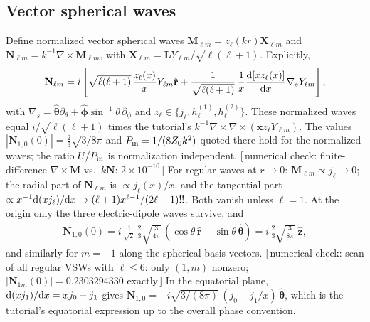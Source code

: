 \documentclass[11pt,letterpaper]{article}
\newcommand{\vect}[1]{\mathbf{#1}}
\newcommand{\Mv}{\vect{M}}
\newcommand{\Nv}{\vect{N}}
\newcommand{\xv}{\vect{x}}
\newcommand{\rhat}{\hat{\vect{r}}}
\newcommand{\zhat}{\hat{\vect{z}}}
\newcommand{\numcheck}[1]{\hfill{\small\color{green!40!black}[\,numerical check: #1\,]}}
\begin{document}
\subsection{Vector spherical waves}
Define normalized vector spherical waves $\Mv_{\ell m}=z_\ell(kr)\vect X_{\ell m}$ and $\Nv_{\ell m}=k^{-1}\nabla\times\Mv_{\ell m}$, with $\vect X_{\ell m}=\vect L Y_{\ell m}/\sqrt{\ell(\ell+1)}$. Explicitly,
\begin{align}
    \Nv_{\ell m} = i\left[\sqrt{\ell(\ell+1)}\,\frac{z_\ell(x)}{x}Y_{\ell m}\rhat+\frac{1}{\sqrt{\ell(\ell+1)}}\,\frac{1}{x}\frac{{\rm d}[xz_\ell(x)]}{{\rm d}x}\nabla_sY_{\ell m}\right],
\end{align}
with $\nabla_s=\hat{\bm\theta}\partial_\theta+\hat{\bm\phi}\sin^{-1}\!\theta\,\partial_\phi$ and $z_\ell\in\{j_\ell,h^{(1)}_\ell,h^{(2)}_\ell\}$. These normalized waves equal $i/\sqrt{\ell(\ell+1)}$ times the tutorial's $k^{-1}\nabla\times\nabla\times(\xv z_\ell Y_{\ell m})$. The values $|\Nv_{1,0}(0)|=\tfrac23\sqrt{3/8\pi}$ and $P_{\rm in}=1/(8Z_0k^2)$ quoted there hold for the normalized waves; the ratio $U/P_{\rm in}$ is normalization independent.
\numcheck{finite-difference $\nabla\times\Mv$ vs.\ $k\Nv$: $2\times10^{-10}$}
For regular waves at $r\to0$: $\Mv_{\ell m}\propto j_\ell\to0$; the radial part of $\Nv_{\ell m}$ is $\propto j_\ell(x)/x$, and the tangential part $\propto x^{-1}{\rm d}(xj_\ell)/{\rm d}x\to(\ell+1)x^{\ell-1}/(2\ell+1)!!$. Both vanish unless $\ell=1$. At the origin only the three electric-dipole waves survive, and
\begin{align}
    \Nv_{1,0}(0) = i\,\tfrac{1}{\sqrt2}\,\tfrac23\sqrt{\tfrac{3}{4\pi}}\,(\cos\theta\,\rhat-\sin\theta\,\hat{\bm\theta}) = i\,\tfrac23\sqrt{\tfrac{3}{8\pi}}\;\zhat,
\end{align}
and similarly for $m=\pm1$ along the spherical basis vectors.
\numcheck{scan of all regular VSWs with $\ell\le6$: only $(1,m)$ nonzero; $|\Nv_{1m}(0)|=0.2303294330$ exactly}
In the equatorial plane, ${\rm d}(xj_1)/{\rm d}x=xj_0-j_1$ gives $\Nv_{1,0}=-i\sqrt{3/(8\pi)}\,(j_0-j_1/x)\,\hat{\bm\theta}$, which is the tutorial's equatorial expression up to the overall phase convention.
\end{document}
